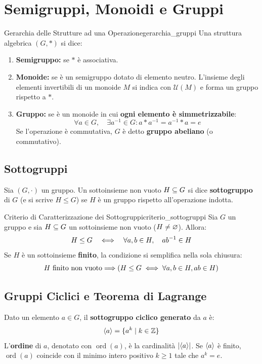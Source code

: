\section{Semigruppi, Monoidi e Gruppi}

\begin{definizione}{Gerarchia delle Strutture ad una Operazione}{gerarchia_gruppi}
Una struttura algebrica $(G, *)$ si dice:
\begin{enumerate}
    \item \textbf{Semigruppo:} se $*$ è associativa.
    \item \textbf{Monoide:} se è un semigruppo dotato di elemento neutro.
    L'insieme degli elementi invertibili di un monoide $M$ si indica con $\mathcal{U}(M)$ e forma un gruppo rispetto a $*$.
    \item \textbf{Gruppo:} se è un monoide in cui \textbf{ogni elemento è simmetrizzabile}:
    \[
        \forall a \in G, \quad \exists a^{-1} \in G : a * a^{-1} = a^{-1} * a = e
    \]
    Se l'operazione è commutativa, $G$ è detto \textbf{gruppo abeliano} (o commutativo).
\end{enumerate}
\end{definizione}

\subsection{Sottogruppi}
Sia $(G, \cdot)$ un gruppo. Un sottoinsieme non vuoto $H \subseteq G$ si dice \textbf{sottogruppo} di $G$ (e si scrive $H \le G$) se $H$ è un gruppo rispetto all'operazione indotta.

\begin{teorema}{Criterio di Caratterizzazione dei Sottogruppi}{criterio_sottogruppi}
Sia $G$ un gruppo e sia $H \subseteq G$ un sottoinsieme non vuoto ($H \neq \varnothing$). Allora:
\[
    H \le G \quad \Longleftrightarrow \quad \forall a, b \in H, \quad a b^{-1} \in H
\]
Se $H$ è un sottoinsieme \textbf{finito}, la condizione si semplifica nella sola chiusura:
\[
    H \text{ finito non vuoto} \Longrightarrow (H \le G \iff \forall a, b \in H, ab \in H)
\]
\end{teorema}

\subsection{Gruppi Ciclici e Teorema di Lagrange}
Dato un elemento $a \in G$, il \textbf{sottogruppo ciclico generato} da $a$ è:
\[
    \langle a \rangle = \{a^k \mid k \in \mathbb{Z}\}
\]
L'\textbf{ordine} di $a$, denotato con $\operatorname{ord}(a)$, è la cardinalità $|\langle a \rangle|$. Se $\langle a \rangle$ è finito, $\operatorname{ord}(a)$ coincide con il minimo intero positivo $k \ge 1$ tale che $a^k = e$.

